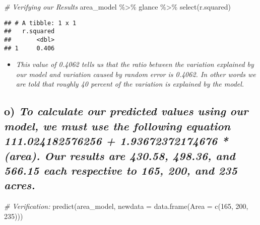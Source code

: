 \documentclass[
]{article}
\newenvironment{Shaded}{\begin{snugshade}}{\end{snugshade}}
\newcommand{\AttributeTok}[1]{\textcolor[rgb]{0.77,0.63,0.00}{#1}}
\newcommand{\CommentTok}[1]{\textcolor[rgb]{0.56,0.35,0.01}{\textit{#1}}}
\newcommand{\DecValTok}[1]{\textcolor[rgb]{0.00,0.00,0.81}{#1}}
\newcommand{\FunctionTok}[1]{\textcolor[rgb]{0.00,0.00,0.00}{#1}}
\newcommand{\NormalTok}[1]{#1}
\newcommand{\SpecialCharTok}[1]{\textcolor[rgb]{0.00,0.00,0.00}{#1}}
\providecommand{\tightlist}{%
  \setlength{\itemsep}{0pt}\setlength{\parskip}{0pt}}
\begin{document}
\begin{Shaded}
\begin{Highlighting}[]
\CommentTok{\# Verifying our Results}
\NormalTok{area\_model }\SpecialCharTok{\%\textgreater{}\%}
\NormalTok{  glance }\SpecialCharTok{\%\textgreater{}\%}
    \FunctionTok{select}\NormalTok{(r.squared)}
\end{Highlighting}
\end{Shaded}

\begin{verbatim}
## # A tibble: 1 x 1
##   r.squared
##       <dbl>
## 1     0.406
\end{verbatim}

\begin{itemize}
\tightlist
\item
  \emph{This value of 0.4062 tells us that the ratio between the
  variation explained by our model and variation caused by random error
  is 0.4062. In other words we are told that roughly 40 percent of the
  variation is explained by the model.}
\end{itemize}

\hypertarget{o-to-calculate-our-predicted-values-using-our-model-we-must-use-the-following-equation-111.024182576256-1.93672372174676-area.-our-results-are-430.58-498.36-and-566.15-each-respective-to-165-200-and-235-acres.}{%
\subsection{\texorpdfstring{o) \emph{To calculate our predicted values
using our model, we must use the following equation 111.024182576256 +
1.93672372174676 * (area). Our results are 430.58, 498.36, and 566.15
each respective to 165, 200, and 235
acres.}}{o) To calculate our predicted values using our model, we must use the following equation 111.024182576256 + 1.93672372174676 * (area). Our results are 430.58, 498.36, and 566.15 each respective to 165, 200, and 235 acres.}}\label{o-to-calculate-our-predicted-values-using-our-model-we-must-use-the-following-equation-111.024182576256-1.93672372174676-area.-our-results-are-430.58-498.36-and-566.15-each-respective-to-165-200-and-235-acres.}}

\begin{Shaded}
\begin{Highlighting}[]
\CommentTok{\# Verification:}
\FunctionTok{predict}\NormalTok{(area\_model, }\AttributeTok{newdata =} \FunctionTok{data.frame}\NormalTok{(}\AttributeTok{Area =} \FunctionTok{c}\NormalTok{(}\DecValTok{165}\NormalTok{, }\DecValTok{200}\NormalTok{, }\DecValTok{235}\NormalTok{)))}
\end{Highlighting}
\end{Shaded}
\end{document}
